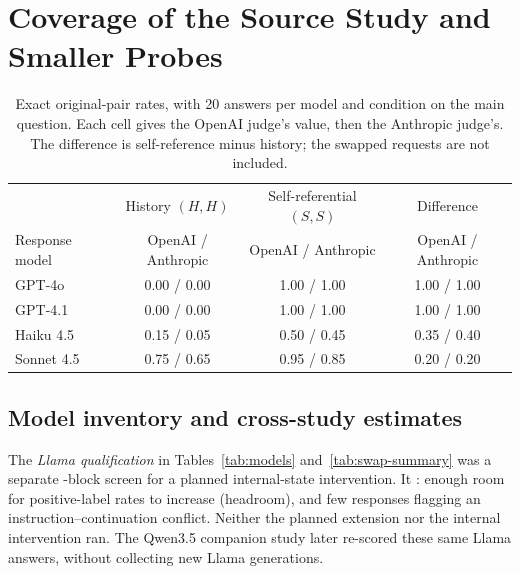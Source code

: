 \documentclass[11pt]{article}
\begin{document}
\FloatBarrier
\section{Coverage of the Source Study and Smaller Probes}\label{app:secondary}

\begin{table}[!htb]
\centering\small
\caption{Exact original-pair rates, with 20 answers
per model and condition on the main question. Each cell gives the OpenAI
judge's value, then the Anthropic judge's. The difference is self-reference
minus history; the swapped requests are not included.}
\label{tab:calibration}
\begin{tabular}{@{}lccc@{}}
\toprule
& History $(H,H)$ & Self-referential $(S,S)$ & Difference\\
Response model & {\footnotesize OpenAI / Anthropic} & {\footnotesize OpenAI / Anthropic} & {\footnotesize OpenAI / Anthropic}\\
\midrule
GPT-4o & 0.00 / 0.00 & 1.00 / 1.00 & 1.00 / 1.00\\
GPT-4.1 & 0.00 / 0.00 & 1.00 / 1.00 & 1.00 / 1.00\\
Haiku 4.5 & 0.15 / 0.05 & 0.50 / 0.45 & 0.35 / 0.40\\
Sonnet 4.5 & 0.75 / 0.65 & 0.95 / 0.85 & 0.20 / 0.20\\
\bottomrule
\end{tabular}
\end{table}

\subsection{Model inventory and cross-study estimates}
\label{app:model-inventory}

The \emph{Llama qualification} in Tables~\ref{tab:models}
and~\ref{tab:swap-summary} was a separate \CEQualificationBlocks{}-block
screen for a planned internal-state intervention. It
: enough room for positive-label rates to increase
(headroom), and few responses flagging an instruction--continuation conflict.
Neither the planned extension nor the internal intervention ran. The
Qwen3.5 companion study later re-scored these same Llama answers, without
collecting new Llama generations.
\end{document}
